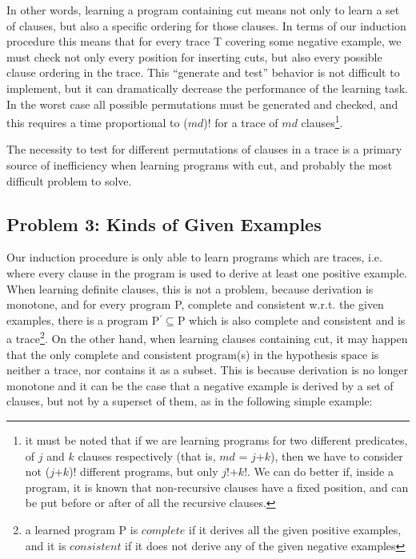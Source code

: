 In other words, learning a program containing cut means not only
to learn a set of clauses, but also a specific ordering for 
those clauses. In terms of our induction procedure this means that 
for every trace T covering some negative example, we must check
not only every position for inserting cuts,
but also every possible clause ordering in the trace. 
This ``generate and test'' behavior is not difficult to implement,
but it can dramatically decrease the performance of the learning task.
In the worst case all possible permutations must be generated and 
checked, and this requires a time proportional to ($md$)!
for a trace of $md$ clauses\footnote{it must be noted that if we are learning 
programs for two different predicates, of $j$ and $k$ clauses
respectively (that is, $md$ = $j$+$k$), 
then we have to consider not ($j$+$k$)! different
programs, but only $j$!+$k$!. We can do better if, inside a program,
it is known that non-recursive clauses have a fixed position, 
and can be put before or after of all the recursive clauses.}.
 
The necessity to test for different permutations of
clauses in a trace is a 
primary source of inefficiency when learning programs with cut,
and probably the most difficult problem to solve.
 
\subsection{Problem 3: Kinds of Given Examples}

Our induction procedure
is only able to learn programs which are traces, i.e. where
every clause in the program is used to derive at least one positive
example. When learning definite clauses, this is not a problem, because
derivation is monotone, and for every program P, complete and consistent
w.r.t. the given examples, there is a program P$^\prime$$\subseteq$P which is
also complete and consistent and is a trace\footnote{
a learned program P is $complete$ if it derives all
the given positive examples, and it is $consistent$ if it does not
derive any of the given negative examples}.
On the other hand, when learning clauses containing cut, 
it may happen that the only complete and consistent 
program(s) in the hypothesis space 
is neither a trace, nor
contains it as a subset. This is because derivation is no longer
monotone and it can be the case that a negative example is derived by
a set of clauses, but not by a superset of them, as in the following
simple example:\\
 
